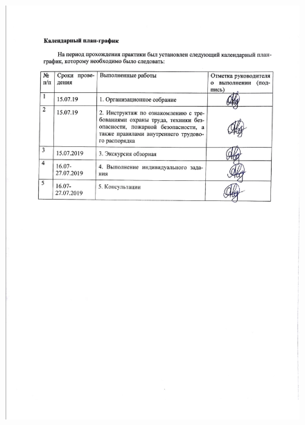 \documentclass[a4paper,12pt,leqno]{article} %
\begin{document}
\begin{figure}[p]
    \includegraphics[scale=0.8]{1111.png}
\end{figure}

\end{document}
